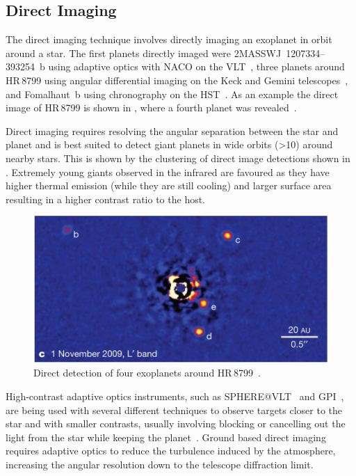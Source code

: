 \subsection{Direct Imaging}
\label{sub:direct_detection}
The direct imaging technique involves directly imaging an exoplanet in orbit around a star.
The first planets directly imaged were {2MASSWJ~1207334--393254~b} using adaptive optics with NACO on the VLT~\citep{chauvin_giant_2004}, three planets around HR\,8799 using angular differential imaging on the Keck and Gemini telescopes~\citep{marois_direct_2008}, and {Fomalhaut~b} using chronography on the HST~\citep{kalas_optical_2008}.
As an example the direct image of {HR\,8799} is shown in , where a fourth planet was revealed~\citep{marois_images_2010}.

Direct imaging requires resolving the angular separation between the star and planet and is best suited to detect giant planets in wide orbits (>10\AU{}) around nearby stars. This is shown by the clustering of direct image detections shown in .
Extremely young giants observed in the infrared are favoured as they have higher thermal emission (while they are still cooling) and larger surface area resulting in a higher contrast ratio to the host.


\begin{figure}
    \centering
    \includegraphics[width=0.5\linewidth]{./figures/introduction/DirectImaging_HR8799_MaroisEtAl2010}
    \caption{Direct detection of four exoplanets around HR\,8799~\citep{marois_images_2010}.}
    \label{fig:directimaging}
\end{figure}

High-contrast adaptive optics instruments, such as SPHERE@VLT~\citep{beuzit_sphere_2008} and GPI~\citep{macintosh_gemini_2008}, are being used with several different techniques to observe targets closer to the star and with smaller contrasts, usually involving blocking or cancelling out the light from the star while keeping the planet~\citep[e.g.][]{marois_direct_2005, mawet_annular_2005, schmid_zimpol_2005, sirbu_prospects_2017, sirbu_techniques_2017, wang_observing_2017}.
Ground based direct imaging requires adaptive optics to reduce the turbulence induced by the atmosphere, increasing the angular resolution down to the telescope diffraction limit.

